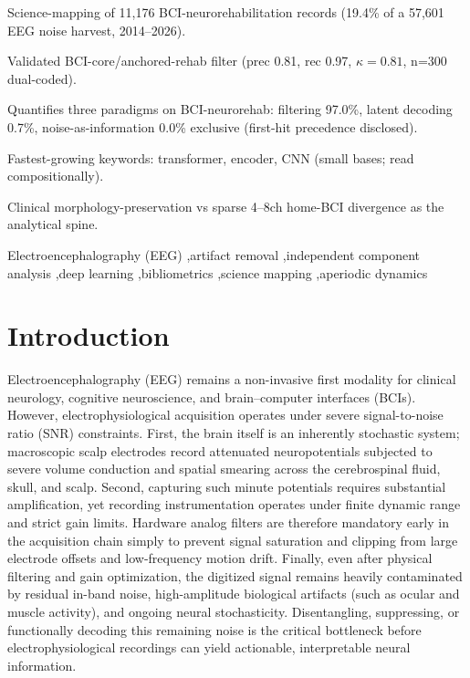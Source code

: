 \documentclass[preprint,12pt]{elsarticle}
\begin{document}
\begin{frontmatter}
\begin{highlights}
\item Science-mapping of 11,176 BCI-neurorehabilitation records (19.4\% of a 57,601 EEG noise harvest, 2014--2026).
\item Validated BCI-core/anchored-rehab filter (prec 0.81, rec 0.97, $\kappa = 0.81$, n=300 dual-coded).
\item Quantifies three paradigms on BCI-neurorehab: filtering 97.0\%, latent decoding 0.7\%, noise-as-information 0.0\% exclusive (first-hit precedence disclosed).
\item Fastest-growing keywords: transformer, encoder, CNN (small bases; read compositionally).
\item Clinical morphology-preservation vs sparse 4--8ch home-BCI divergence as the analytical spine.
\end{highlights}

\begin{keyword}
Electroencephalography (EEG) \sep artifact removal \sep independent component analysis \sep deep learning \sep bibliometrics \sep science mapping \sep aperiodic dynamics
\end{keyword}

\end{frontmatter}

\section{Introduction}
Electroencephalography (EEG) remains a non-invasive first modality for clinical neurology, cognitive neuroscience, and brain--computer interfaces (BCIs). However, electrophysiological acquisition operates under severe signal-to-noise ratio (SNR) constraints. First, the brain itself is an inherently stochastic system; macroscopic scalp electrodes record attenuated neuropotentials subjected to severe volume conduction and spatial smearing across the cerebrospinal fluid, skull, and scalp. Second, capturing such minute potentials requires substantial amplification, yet recording instrumentation operates under finite dynamic range and strict gain limits. Hardware analog filters are therefore mandatory early in the acquisition chain simply to prevent signal saturation and clipping from large electrode offsets and low-frequency motion drift. Finally, even after physical filtering and gain optimization, the digitized signal remains heavily contaminated by residual in-band noise, high-amplitude biological artifacts (such as ocular and muscle activity), and ongoing neural stochasticity. Disentangling, suppressing, or functionally decoding this remaining noise is the critical bottleneck before electrophysiological recordings can yield actionable, interpretable neural information.
\end{document}
